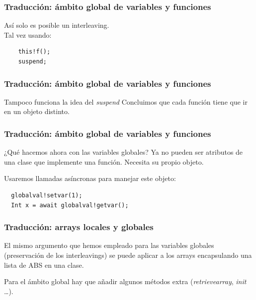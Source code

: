 \documentclass[spanish, a4paper, 12pt, final, slideColor, nototal, colorBG, pdf, noaccumulate, darkblue] {beamer}
\begin{document}
\begin{frame}[fragile]
  \frametitle{Traducción: ámbito global de variables y funciones}
  \fontsize{5}{7.2}\selectfont
  \begin{multicols}{2}
    
    \vfill
    \fontsize{10}{7.2}\selectfont
    Así solo es posible un interleaving.\\
    \vfill
    Tal vez usando:
    \fontsize{5}{7.2}\selectfont
    \begin{lstlisting}
    this!f();
    suspend;
    \end{lstlisting}
    \vfill\null
    \columnbreak
    
  \end{multicols}
\end{frame}

\begin{frame}[fragile]
  \frametitle{Traducción: ámbito global de variables y funciones}
  Tampoco funciona la idea del \emph{suspend}
  {\fontsize{6}{7.2}\selectfont
    }
  Concluimos que cada función tiene que ir en un objeto distinto.
\end{frame}

\begin{frame}[fragile]
  \frametitle{Traducción: ámbito global de variables y funciones}
  ¿Qué hacemos ahora con las variables globales? Ya no pueden ser atributos de una clase que implemente una función. Necesita su propio objeto.
  \begin{multicols}{2}
  {\fontsize{6}{7.2}\selectfont
    }
  \end{multicols}
  Usaremos llamadas asíncronas para manejar este objeto:
  \fontsize{6}{7.2}\selectfont
  \begin{lstlisting}
  globalval!setvar(1);
  Int x = await globalval!getvar();
  \end{lstlisting}
\end{frame}

\begin{frame}[fragile]
  \frametitle{Traducción: arrays locales y globales}
  El mismo argumento que hemos empleado para las variables globales (preservación de los interleavings) se puede aplicar a los arrays encapsulando una lista de ABS en una clase.
  \begin{multicols}{2}
  {\fontsize{6}{7.2}\selectfont
    }
  \end{multicols}
  Para el ámbito global hay que añadir algunos métodos extra (\emph{retrievearray}, \emph{init} \dots).
\end{frame}
\end{document}
